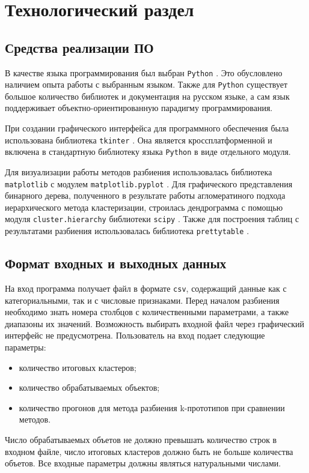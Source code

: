 \chapter{Технологический раздел}

\section{Средства реализации ПО}

В качестве языка программирования был выбран \texttt{Python} \cite{Python}. Это обусловлено наличием опыта работы с выбранным языком. Также для \texttt{Python} существует большое количество библиотек и документация на русском языке, а сам язык поддерживает объектно-ориентированную парадигму программирования.

При создании графического интерфейса для программного обеспечения была использована библиотека \texttt{tkinter} \cite{Tkinter}. Она является кроссплатформенной и включена в стандартную библиотеку языка \texttt{Python} в виде отдельного модуля.

Для визуализации работы методов разбиения использовалась библиотека \texttt{matplotlib} \cite{Matplotlib} с модулем \texttt{matplotlib.pyplot} \cite{Pyplot}. Для графического представления бинарного дерева, полученного в результате работы агломератиного подхода иерархического метода кластеризации, строилась дендрограмма с помощью модуля \texttt{cluster.hierarchy} \cite{ClusterHierarchy} библиотеки \texttt{scipy} \cite{SciPy}. Также для построения таблиц с результатами разбиения использовалась библиотека \texttt{prettytable} \cite{Prettytable}.

\section{Формат входных и выходных данных}

На вход программа получает файл в формате \texttt{csv}, содержащий данные как с категориальными, так и с числовые признаками. Перед началом разбиения необходимо знать номера столбцов с количественными параметрами, а также диапазоны их значений. Возможность выбирать входной файл через графический интерфейс не предусмотрена. Пользователь на вход подает следующие параметры:
\begin{itemize}
    \item количество итоговых кластеров;
    \item количество обрабатываемых объектов;
    \item количество прогонов для метода разбиения k-прототипов при сравнении методов.
\end{itemize}
Число обрабатываемых объетов не должно превышать количество строк в входном файле, число итоговых кластеров должно быть не больше количества объетов. Все входные параметры должны являться натуральными числами.

